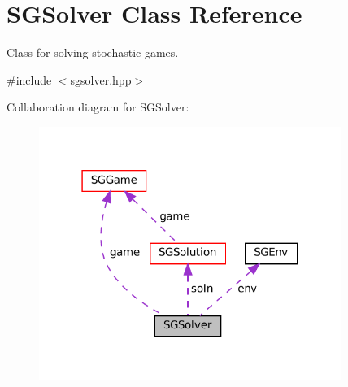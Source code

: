 \hypertarget{classSGSolver}{}\section{S\+G\+Solver Class Reference}
\label{classSGSolver}


Class for solving stochastic games.  




{\ttfamily \#include $<$sgsolver.\+hpp$>$}



Collaboration diagram for S\+G\+Solver\+:
\nopagebreak
\begin{figure}[H]
\begin{center}
\leavevmode
\includegraphics[width=279pt]{classSGSolver__coll__graph}
\end{center}
\end{figure}
